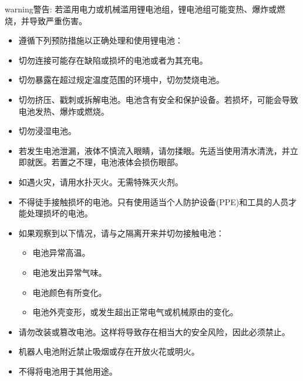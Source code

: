 \documentclass[a4paper,11pt,english,openany,oneside]{sphinxmanual}
\begin{document}
\begin{sphinxadmonition}{warning}{警告:}
\sphinxAtStartPar
若滥用电力或机械滥用锂电池组，锂电池组可能变热、爆炸或燃烧，并导致严重伤害。
\begin{itemize}
\item {} 
\sphinxAtStartPar
遵循下列预防措施以正确处理和使用锂电池：

\item {} 
\sphinxAtStartPar
切勿连接可能存在缺陷或损坏的电池或者为其充电。

\item {} 
\sphinxAtStartPar
切勿暴露在超过规定温度范围的环境中，切勿焚烧电池。

\item {} 
\sphinxAtStartPar
切勿挤压、戳刺或拆解电池。电池含有安全和保护设备。若损坏，可能会导致电池发热、爆炸或燃烧。

\item {} 
\sphinxAtStartPar
切勿浸湿电池。

\item {} 
\sphinxAtStartPar
若发生电池泄漏，液体不慎流入眼睛，请勿揉眼。先适当使用清水清洗，并立即就医。若置之不理，电池液体会损伤眼部。

\item {} 
\sphinxAtStartPar
如遇火灾，请用水扑灭火。无需特殊灭火剂。

\item {} 
\sphinxAtStartPar
不得徒手接触损坏的电池。只有使用适当个人防护设备(PPE)和工具的人员才能处理损坏的电池。

\item {} 
\sphinxAtStartPar
如果观察到以下情况，请与之隔离开来并切勿接触电池：
\begin{itemize}
\item {} 
\sphinxAtStartPar
电池异常高温。

\item {} 
\sphinxAtStartPar
电池发出异常气味。

\item {} 
\sphinxAtStartPar
电池颜色有所变化。

\item {} 
\sphinxAtStartPar
电池外壳变形，或发生超出正常电气或机械原由的变化。

\end{itemize}

\item {} 
\sphinxAtStartPar
请勿改装或篡改电池。这样将导致存在相当大的安全风险，因此必须禁止。

\item {} 
\sphinxAtStartPar
机器人电池附近禁止吸烟或存在开放火花或明火。

\item {} 
\sphinxAtStartPar
不得将电池用于其他用途。

\end{itemize}
\end{sphinxadmonition}
\end{document}
